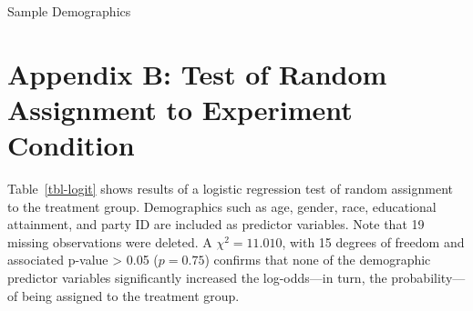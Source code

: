 \documentclass[
  12pt,
  letterpaper,
]{article}
\begin{document}
\begin{table}[H]

\caption{\label{tbl-demog3}Sample Demographics}


\end{table}%

\newpage{}

\section{Appendix B: Test of Random Assignment to Experiment
Condition}\label{appendix-b-test-of-random-assignment-to-experiment-condition}

Table~\ref{tbl-logit} shows results of a logistic regression test of
random assignment to the treatment group. Demographics such as age,
gender, race, educational attainment, and party ID are included as
predictor variables. Note that 19 missing observations were deleted. A
\(\chi^2 = 11.010\), with 15 degrees of freedom and associated p-value
\textgreater{} 0.05 (\(p = 0.75\)) confirms that none of the demographic
predictor variables significantly increased the log-odds---in turn, the
probability---of being assigned to the treatment group.
\end{document}
